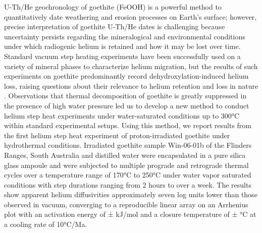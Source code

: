 %
U-Th/He geochronology of goethite (FeOOH) is a powerful method to
quantitatively date weathering and erosion processes on Earth's surface;
however, precise interpretation of goethite U-Th/He dates is challenging
because uncertainty persists regarding the mineralogical and environmental
conditions under which radiogenic helium is retained and how it may be lost over
time. Standard vacuum step heating experiments have been successfully
used on a variety of mineral phases to characterize helium migration,
but the results of such experiments on goethite predominantly record 
dehydroxylation-induced helium loss, raising questions about their relevance to
helium retention and loss in nature \citep{farley2024}. Observations
that thermal decomposition of goethite is greatly suppressed in the presence
of high water pressure led us to develop a new method to conduct helium
step heat experiments under water-saturated conditions up to 300°C within 
standard experimental setups. Using this method, we report
results from the first helium step heat experiment of proton-irradiated
goethite under hydrothermal conditions. Irradiated goethite sample
Win-06-01b of the Flinders Ranges, South Australia and distilled
water were encapsulated in a pure silica glass ampoule and were
subjected to multiple prograde and retrograde thermal cycles over a
temperature range of 170°C to 250°C under water vapor saturated
conditions with step durations ranging from 2 hours to over a week. The results show apparent helium diffusivities approximately
seven log units lower than those observed in vacuum, converging to 
a reproducible linear array on an Arrhenius plot with an activation energy of \ChTwoEa
± \ChTwoEaErr kJ/mol and a closure temperature of \ChTwoTc ± \ChTwoTcErr °C at a cooling rate of 10°C/Ma.
